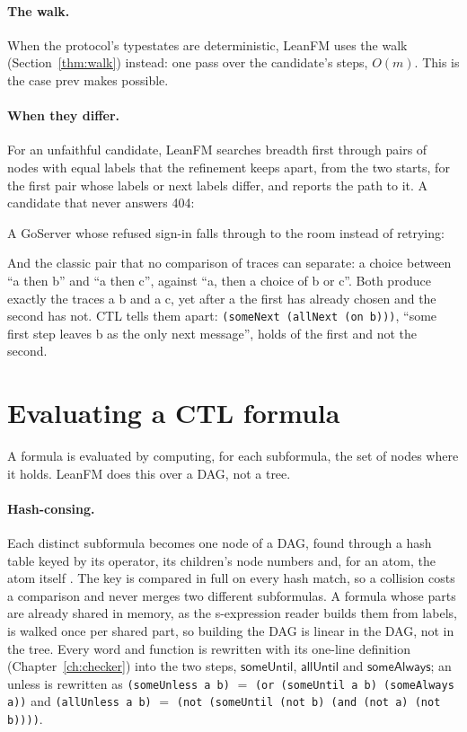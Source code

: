 \paragraph{The walk.} When the protocol's typestates are deterministic, LeanFM uses the
walk (Section~\ref{thm:walk}) instead: one pass over the candidate's steps, $O(m)$.
This is the case prev makes possible.

\paragraph{When they differ.} For an unfaithful candidate, LeanFM searches breadth first
through pairs of nodes with equal labels that the refinement keeps apart, from the two
starts, for the first pair whose labels or next labels differ, and reports the path to
it. A candidate that never answers 404:


A GoServer whose refused sign-in falls through to the room instead of retrying:


And the classic pair that no comparison of traces can separate: a choice between ``a then
b'' and ``a then c'', against ``a, then a choice of b or c''. Both produce exactly the traces
a b and a c, yet after a the first has already chosen and the second has not. CTL tells
them apart: \texttt{(someNext (allNext (on b)))}, ``some first step leaves b as the only
next message'', holds of the first and not the second.


\section{Evaluating a CTL formula}

A formula is evaluated by computing, for each subformula, the set of nodes where it
holds. LeanFM does this over a DAG, not a tree.

\paragraph{Hash-consing.} Each distinct subformula becomes one node of a DAG, found
through a hash table keyed by its operator, its children's node numbers and, for an
atom, the atom itself \citep{filliatre2006hashconsing}. The key is compared in full on
every hash match, so a collision costs a comparison and never merges two different
subformulas. A formula whose parts are already shared in memory, as the s-expression
reader builds them from labels, is walked once per shared part, so building the DAG is
linear in the DAG, not in the tree. Every word and function is rewritten with its one-line
definition (Chapter~\ref{ch:checker}) into the two steps, $\mathsf{someUntil}$,
$\mathsf{allUntil}$ and $\mathsf{someAlways}$; an unless is rewritten as
\texttt{(someUnless a b)} $=$ \texttt{(or (someUntil a b) (someAlways a))}
and \texttt{(allUnless a b)} $=$ \texttt{(not (someUntil (not b) (and (not a) (not b))))}.

